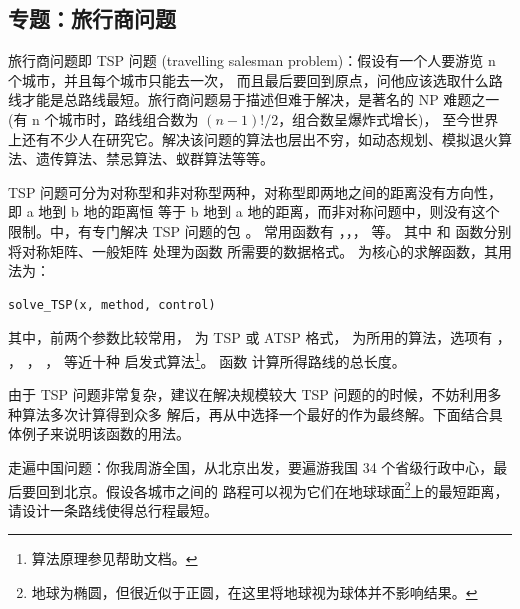 \subsection{专题：旅行商问题}
 旅行商问题即 TSP 问题 (travelling salesman problem)：假设有一个人要游览 n 个城市，并且每个城市只能去一次，
 而且最后要回到原点，问他应该选取什么路线才能是总路线最短。旅行商问题易于描述但难于解决，是著名的 NP 难题之一 (有
  n 个城市时，路线组合数为 $(n-1)!/2$，组合数呈爆炸式增长)，
 至今世界上还有不少人在研究它。解决该问题的算法也层出不穷，如动态规划、模拟退火算法、遗传算法、禁忌算法、蚁群算法等等。
 
 
 TSP 问题可分为对称型和非对称型两种，对称型即两地之间的距离没有方向性，即 a 地到 b 地的距离恒
 等于 b 地到 a 地的距离，而非对称问题中，则没有这个限制。\R 中，有专门解决 TSP 问题的包  \citep{TSP08}。
 常用函数有 ，，， 等。
 其中  和  函数分别将对称矩阵、一般矩阵
处理为函数  所需要的数据格式。
 为核心的求解函数，其用法为：

\begin{verbatim}
solve_TSP(x, method, control)
\end{verbatim}

其中，前两个参数比较常用， 为 TSP 或 ATSP 格式， 为所用的算法，选项有
 ， ，
，  ，  等近十种
启发式算法\footnote{算法原理参见帮助文档。}。
函数  计算所得路线的总长度。


由于 TSP 问题非常复杂，建议在解决规模较大 TSP 问题的的时候，不妨利用多种算法多次计算得到众多
 解后，再从中选择一个最好的作为最终解。下面结合具体例子来说明该函数的用法。
 \begin{exmp}\label{ex:path_china}
 走遍中国问题：你我周游全国，从北京出发，要遍游我国 34 个省级行政中心，最后要回到北京。假设各城市之间的
 路程可以视为它们在地球球面\footnote{地球为椭圆，但很近似于正圆，在这里将地球视为球体并不影响结果。}上的最短距离，
 请设计一条路线使得总行程最短。
 \end{exmp}



